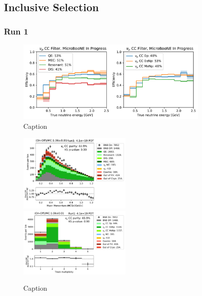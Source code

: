 \subsection{Inclusive Selection}
\label{ssec:NuMUCCsel:INC}

\subsubsection{Run 1}
\label{sssec:NuMUCCsel:INC:Run1}


\begin{figure}
    \centering
    \includegraphics[width=0.85\textwidth]{NuMuCCsel/Images/run1/numu_efficiency_run1.pdf}
    \caption{Caption}
    \label{fig:numu_eff_r1}
\end{figure}

\begin{figure}
    \centering
    \includegraphics[width=0.495\textwidth]{NuMuCCsel/Images/run1/numu_mcsmom_run1.pdf} \hfill
    \includegraphics[width=0.495\textwidth]{NuMuCCsel/Images/run1/numu_vtxntrack_cat_run1.pdf}
    \caption{Caption}
    \label{fig:numu_mcs}
\end{figure}

